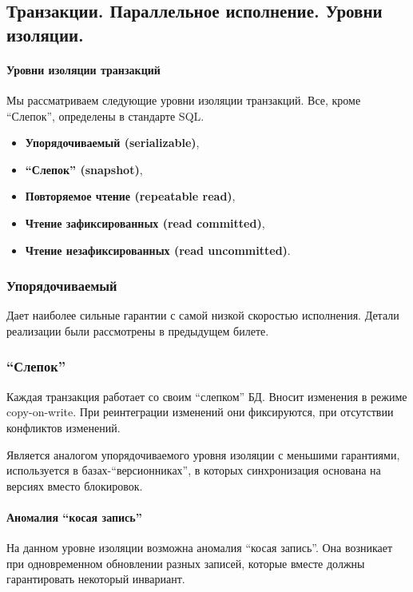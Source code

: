\subsection{Транзакции. Параллельное исполнение. Уровни изоляции.}

\paragraph{Уровни изоляции транзакций}

Мы рассматриваем следующие уровни изоляции транзакций. Все, кроме ``Слепок'', определены в
стандарте SQL.

\begin{itemize}
	\item \textbf{Упорядочиваемый (serializable)},
	\item \textbf{``Слепок'' (snapshot)},
	\item \textbf{Повторяемое чтение (repeatable read)},
	\item \textbf{Чтение зафиксированных (read committed)},
	\item \textbf{Чтение незафиксированных (read uncommitted)}.
\end{itemize}

\subsubsection{Упорядочиваемый}

Дает наиболее сильные гарантии с самой низкой скоростью исполнения. Детали реализации были
рассмотрены в предыдущем билете.

\subsubsection{``Слепок''}

Каждая транзакция работает со своим ``слепком'' БД. Вносит изменения в режиме copy-on-write. При
реинтеграции изменений они фиксируются, при отсутствии конфликтов изменений.

Является аналогом упорядочиваемого уровня изоляции с меньшими гарантиями, используется в
базах-``версионниках'', в которых синхронизация основана на версиях вместо блокировок.

\paragraph{Аномалия ``косая запись''}
На данном уровне изоляции возможна аномалия ``косая запись''. Она возникает при одновременном
обновлении разных записей, которые вместе должны гарантировать некоторый инвариант.

